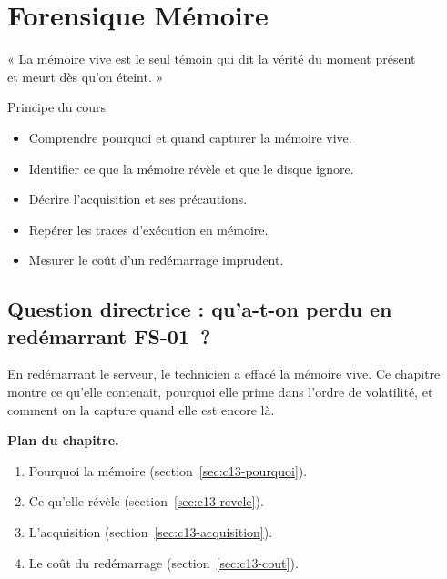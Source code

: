 
\chapter{Forensique Mémoire}
\label{chap:memoire}

\epigraph{%
    « La mémoire vive est le seul témoin qui dit la vérité du moment présent\\
    et meurt dès qu'on éteint. »%
}{Principe du cours}


\begin{boxobjectifs}
\begin{itemize}
    \item Comprendre pourquoi et quand capturer la mémoire vive.
    \item Identifier ce que la mémoire révèle et que le disque ignore.
    \item Décrire l'acquisition et ses précautions.
    \item Repérer les traces d'exécution en mémoire.
    \item Mesurer le coût d'un redémarrage imprudent.
\end{itemize}
\end{boxobjectifs}

\bigskip

\section*{Question directrice : qu'a-t-on perdu en redémarrant FS-01~?}

En redémarrant le serveur, le technicien a effacé la mémoire vive. Ce
chapitre montre ce qu'elle contenait, pourquoi elle prime dans l'ordre de
volatilité, et comment on la capture quand elle est encore là.

\medskip
\textbf{Plan du chapitre.}
\begin{enumerate}
    \item Pourquoi la mémoire (section~\ref{sec:c13-pourquoi}).
    \item Ce qu'elle révèle (section~\ref{sec:c13-revele}).
    \item L'acquisition (section~\ref{sec:c13-acquisition}).
    \item Le coût du redémarrage (section~\ref{sec:c13-cout}).
\end{enumerate}

